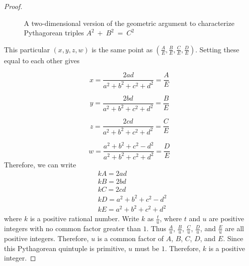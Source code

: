 \documentclass[12pt,table]{article}
\theoremstyle{definition}
\theoremstyle{remark}
\numberwithin{equation}{section}
\begin{document}
\begin{proof}
\begin{figure}
\begin{center}
\end{center}  
\caption{A two-dimensional version of the geometric argument
to characterize Pythagorean triples 
$A^2~+~B^2~=~C^2$}
\end{figure}





This particular $(x,y,z,w)$ is the same point as
$\left(\frac{A}{E},\frac{B}{E},\frac{C}{E},\frac{D}{E}\right)$. 
Setting these equal to each other gives

$$x=\frac{2ad}{a^2+b^2+c^2+d^2}=\frac{A}{E}$$

$$y=\frac{2bd}{a^2+b^2+c^2+d^2}=\frac{B}{E}$$

$$z=\frac{2cd}{a^2+b^2+c^2+d^2}=\frac{C}{E}$$

$$w=\frac{a^2+b^2+c^2-d^2}{a^2+b^2+c^2+d^2}=\frac{D}{E}$$
Therefore, we can write
\begin{align*}
     & kA = 2ad     
\\
     & kB = 2bd     
\\
     & kC = 2cd     
\\
     & kD = a^2 + b^2 + c^2 - d^2     
\\
     & kE = a^2 + b^2 + c^2 + d^2
\end{align*}     
\noindent
where $k$ is a positive rational number. 
Write $k$ as $\frac{t}{u}$, 
where $t$ and $u$ are positive integers with no common factor 
greater than $1$. 
Thus
$\frac{A}{u}$, $\frac{B}{u}$, $\frac{C}{u}$,
$\frac{D}{u}$, and $\frac{E}{u}$ are all positive integers.
 Therefore, $u$ is a common factor of $A$, $B$, $C$, $D$, and $E$. 
Since this Pythagorean quintuple is primitive, $u$ must be $1$.
Therefore, $k$ is a positive integer.
\end{proof}
\end{document}
